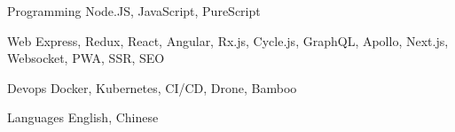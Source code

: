 

\begin{cvskills}

  \cvskill
    {Programming} %
    {Node.JS, JavaScript, PureScript} %

  \cvskill
    {Web} %
    {Express, Redux, React, Angular, Rx.js, Cycle.js, GraphQL, Apollo, Next.js, Websocket, PWA, SSR, SEO} %

  \cvskill
    {Devops} %
    {Docker, Kubernetes, CI/CD, Drone, Bamboo} %

  \cvskill
    {Languages} %
    {English, Chinese} %

\end{cvskills}
